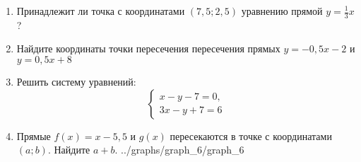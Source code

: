 \documentclass[12pt, a4paper]{article}
\begin{document}
	  
	\begin{enumerate}
		\item Принадлежит ли точка с координатами $(7,5;2,5)$ уравнению прямой $y=\frac{1}{3}x$?
		\item Найдите координаты точки пересечения пересечения прямых $y=-0,5x-2$ и $y=0,5x+8$
		\item Решить систему уравнений:
		$$\left\{
		\begin{array}{l}
			x-y-7=0,\\
			3x-y+7=6
		\end{array}
		\right.$$ 
		\item \funcexer
		{Прямые $f(x)=x-5,5$ и $g(x)$ пересекаются в точке с координатами $(a;b)$. Найдите $a+b$. }
		{../graphs/graph_6/graph_6}
		
	\end{enumerate}
\end{document}
